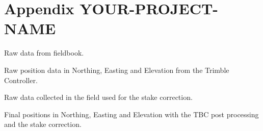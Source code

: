 

\chapter{Appendix YOUR-PROJECT-NAME}
\label{studentxx:appendix}


Raw data from fieldbook.
\begin{table}[h]
\caption{Raw position data in Northing, Easting and Elevation from the Trimble Controller.}
\centering

\label{GPS:tab:fb_pos_tab}
\end{table}

\begin{table}[h]
\caption{Raw data collected in the field used for the stake correction.}
\centering

\label{GPS:tab:fb_other_tab}
\end{table}

\begin{table}[h]
\caption{Final positions in Northing, Easting and Elevation with the TBC post processing and the stake correction.}
\centering 

\label{GPS:tab:tbc_tab}
\end{table}